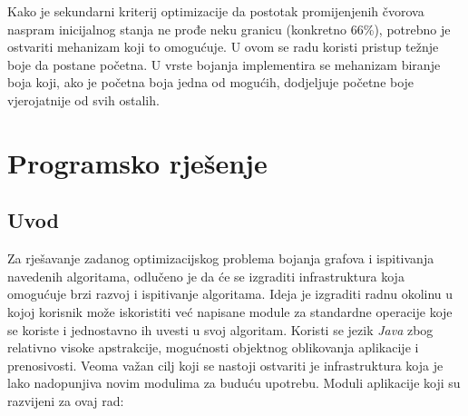 \documentclass[times, utf8, diplomski, numeric]{fer}
\begin{document}
Kako je sekundarni kriterij optimizacije da postotak promijenjenih čvorova naspram inicijalnog stanja ne prođe neku granicu (konkretno 66\%), potrebno je ostvariti mehanizam koji to omogućuje. U ovom se radu koristi pristup težnje boje da postane početna. U vrste bojanja implementira se mehanizam biranje boja koji, ako je početna boja jedna od mogućih, dodjeljuje početne boje vjerojatnije od svih ostalih. 

\chapter{Programsko rješenje}

\section{Uvod}

Za rješavanje zadanog optimizacijskog problema bojanja grafova i ispitivanja navedenih algoritama, odlučeno je da će se izgraditi infrastruktura koja omogućuje brzi razvoj i ispitivanje algoritama. Ideja je izgraditi radnu okolinu u kojoj korisnik može iskoristiti već napisane module za standardne operacije koje se koriste i jednostavno ih uvesti u svoj algoritam. Koristi se jezik \emph{Java} zbog relativno visoke apstrakcije, mogućnosti objektnog oblikovanja aplikacije i prenosivosti. Veoma važan cilj koji se nastoji ostvariti je infrastruktura koja je lako nadopunjiva novim modulima za buduću upotrebu. Moduli aplikacije koji su razvijeni za ovaj rad:
\end{document}

